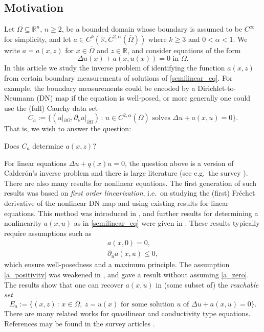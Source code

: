 \documentclass[11pt,a4paper]{amsart}
\theoremstyle{definition}
\numberwithin{equation}{section}
\newcommand{\mR}{\mathbb{R}}                    %
\newcommand{\ol}[1]{\overline{#1}}
\newcommand{\p}{\partial}
\newcommand{\Om}{\Omega}
\begin{document}
\subsection*{Motivation}

Let $\Omega \subseteq \mR^n$, $n\geq2$, be a bounded domain whose boundary is assumed to be $C^{\infty}$ for simplicity, and let $a \in C^{k}(\mR, C^{2,\alpha}(\ol{\Omega}))$ where $k \geq 3$ and $0 < \alpha < 1$. We write $a = a(x,z)$ for $x \in \ol{\Om}$ and $z \in \mR$, and consider equations of the form 
\begin{equation} \label{semilinear_eq}
	\Delta u(x) + a(x, u(x)) = 0 \text{ in }\Omega.
\end{equation}
In this article we study the inverse problem of identifying the function \( a(x,z) \) from certain boundary measurements of solutions of \eqref{semilinear_eq}. For example, the boundary measurements could be encoded by a Dirichlet-to-Neumann (DN) map if the equation is well-posed, or more generally one could use the (full) Cauchy data set 
\[
	C_a := \{ (u|_{\p \Omega}, \p_{\nu} u|_{\p \Omega}) \,:\, u \in C^{2,\alpha}(\ol{\Omega}) \text{ solves $\Delta u + a(x,u) = 0$} \}.
\]
That is, we wish to answer the question:
\begin{center}
	Does \( C_{a} \) determine \( a(x,z) \)?
\end{center}

For linear equations $\Delta u + q(x) u = 0$, the question above is a version of Calderón's inverse problem and there is large literature (see e.g.\ the survey \cite{Uhlmann_survey}). There are also many results for nonlinear equations. The first generation of such results was based on \emph{first order linearization}, i.e.\ on studying the (first) Fréchet derivative of the nonlinear DN map and using existing results for linear equations. This method was introduced in \cite{Isakov1993}, and further results for determining a nonlinearity $a(x,u)$ as in \eqref{semilinear_eq} were given in \cites{IS, IN, ImanuvilovYamamoto2013}. These results typically require assumptions such as 
\begin{gather} 
a(x,0)= 0, \label{a_zero} \\
\p_u a(x,u) \leq 0, \label{a_positivity}
\end{gather}
which ensure well-posedness and a maximum principle. The assumption \eqref{a_positivity} was weakened in \cite{IN}, and  \cite{Sun} gave a result without assuming \eqref{a_zero}. The results show that one can recover $a(x,u)$ in (some subset of) the \emph{reachable set} 
\[
E_a := \{ (x,z) \,:\, x \in \ol{\Om}, \ z = u(x) \text{ for some solution $u$ of $\Delta u + a(x,u) =0$} \}.
\]
There are many related works for quasilinear and conductivity type equations. References may be found in the survey articles \cites{Sun2005, Uhlmann2009}.
\end{document}
